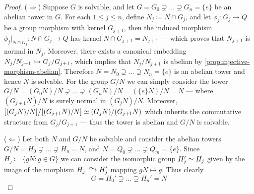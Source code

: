 \begin{proof}
(\(\Rightarrow\)) Suppose \(G\) is solvable, and let \(G = G_0 \supsetneq \dots
\supsetneq G_n = \{e\}\) be an abelian tower in \(G\).  For each \(1 \leq j \leq
n\), define \(N_{j} \coloneq N \cap G_j\), and let \(\phi_j: G_j \to Q\) be a
group morphism with kernel \(G_{j+1}\), then the induced morphism \(\phi_j|_{N
\cap G_j}: N \cap G_j \to Q\) has kernel \(N \cap G_{j+1} = N_{j+1}\) --- which
proves that \(N_{j+1}\) is normal in \(N_j\). Moreover, there exists a canonical
embedding \(N_j/N_{j+1} \hookrightarrow G_j/G_{j+1}\), which implies that \(N_j/N_{j+1}\)
is abelian by \cref{prop:injective-morphism-abelian}. Therefore \(N = N_0
\supsetneq \dots \supsetneq N_n = \{e\}\) is an abelian tower and hence \(N\) is
solvable. For the group \(G/N\) we can simply consider the tower \(G/N = (G_0
N)/N \supsetneq \dots \supsetneq (G_n N)/N = (\{e\} N)/N = N\) --- where
\((G_{j+1} N)/N\) is surely normal in \((G_j N)/N\). Moreover, \([(G_j N)/N]
\big/ [(G_{j+1} N)/N] \simeq (G_j N)/(G_{j+1} N)\) which inherits the commutative
structure from \(G_j/G_{j+1}\) --- thus the tower is abelian and \(G/N\) is
solvable.

(\(\Leftarrow\)) Let both \(N\) and \(G/N\) be solvable and consider the abelian
towers \(G/N = H_0 \supsetneq \dots \supsetneq H_n = N\), and \(N = Q_0
\supsetneq \dots \supsetneq Q_m = \{e\}\). Since \(H_j \coloneq \{g N \colon g
\in G\}\) we can consider the isomorphic group \(H_j' \simeq H_j\) given by the
image of the morphism \(H_{j} \isoto H_j'\) mapping \(g N \mapsto g\). Thus
clearly
\[
  G = H_0' \supsetneq \dots \supsetneq H_n' = N
\]
\end{proof}

